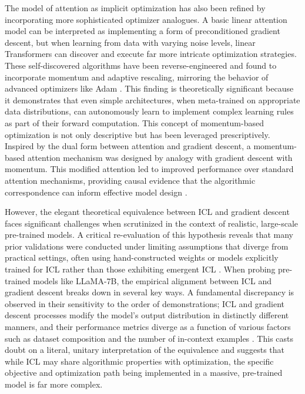 \documentclass[11pt]{article}
\begin{document}
The model of attention as implicit optimization has also been refined by incorporating more sophisticated optimizer analogues. A basic linear attention model can be interpreted as implementing a form of preconditioned gradient descent, but when learning from data with varying noise levels, linear Transformers can discover and execute far more intricate optimization strategies. These self-discovered algorithms have been reverse-engineered and found to incorporate momentum and adaptive rescaling, mirroring the behavior of advanced optimizers like Adam \cite{ref43}. This finding is theoretically significant because it demonstrates that even simple architectures, when meta-trained on appropriate data distributions, can autonomously learn to implement complex learning rules as part of their forward computation. This concept of momentum-based optimization is not only descriptive but has been leveraged prescriptively. Inspired by the dual form between attention and gradient descent, a momentum-based attention mechanism was designed by analogy with gradient descent with momentum. This modified attention led to improved performance over standard attention mechanisms, providing causal evidence that the algorithmic correspondence can inform effective model design \cite{ref25}.

However, the elegant theoretical equivalence between ICL and gradient descent faces significant challenges when scrutinized in the context of realistic, large-scale pre-trained models. A critical re-evaluation of this hypothesis reveals that many prior validations were conducted under limiting assumptions that diverge from practical settings, often using hand-constructed weights or models explicitly trained for ICL rather than those exhibiting emergent ICL \cite{ref26}. When probing pre-trained models like LLaMA-7B, the empirical alignment between ICL and gradient descent breaks down in several key ways. A fundamental discrepancy is observed in their sensitivity to the order of demonstrations; ICL and gradient descent processes modify the model's output distribution in distinctly different manners, and their performance metrics diverge as a function of various factors such as dataset composition and the number of in-context examples \cite{ref26}. This casts doubt on a literal, unitary interpretation of the equivalence and suggests that while ICL may share algorithmic properties with optimization, the specific objective and optimization path being implemented in a massive, pre-trained model is far more complex.
\end{document}
